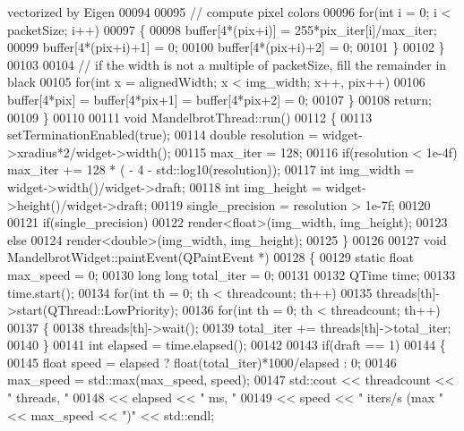 \begin{DoxyCode}
{       vectorized by Eigen}
00094 
00095       \textcolor{comment}{// compute pixel colors}
00096       \textcolor{keywordflow}{for}(\textcolor{keywordtype}{int} i = 0; i < packetSize; i++)
00097       \{
00098         buffer[4*(pix+i)] = 255*pix\_iter[i]/max\_iter;
00099         buffer[4*(pix+i)+1] = 0;
00100         buffer[4*(pix+i)+2] = 0;
00101       \}
00102     \}
00103 
00104     \textcolor{comment}{// if the width is not a multiple of packetSize, fill the remainder in black}
00105     \textcolor{keywordflow}{for}(\textcolor{keywordtype}{int} x = alignedWidth; x < img\_width; x++, pix++)
00106       buffer[4*pix] = buffer[4*pix+1] = buffer[4*pix+2] = 0;
00107   \}
00108   \textcolor{keywordflow}{return};
00109 \}
00110 
00111 \textcolor{keywordtype}{void} MandelbrotThread::run()
00112 \{
00113   setTerminationEnabled(\textcolor{keyword}{true});
00114   \textcolor{keywordtype}{double} resolution = widget->xradius*2/widget->width();
00115   max\_iter = 128;
00116   \textcolor{keywordflow}{if}(resolution < 1e-4f) max\_iter += 128 * ( - 4 - std::log10(resolution));
00117   \textcolor{keywordtype}{int} img\_width = widget->width()/widget->draft;
00118   \textcolor{keywordtype}{int} img\_height = widget->height()/widget->draft;
00119   single\_precision = resolution > 1e-7f;
00120 
00121   \textcolor{keywordflow}{if}(single\_precision)
00122     render<float>(img\_width, img\_height);
00123   \textcolor{keywordflow}{else}
00124     render<double>(img\_width, img\_height);
00125 \}
00126 
00127 \textcolor{keywordtype}{void} MandelbrotWidget::paintEvent(QPaintEvent *)
00128 \{
00129   \textcolor{keyword}{static} \textcolor{keywordtype}{float} max\_speed = 0;
00130   \textcolor{keywordtype}{long} \textcolor{keywordtype}{long} total\_iter = 0;
00131 
00132   QTime time;
00133   time.start();
00134   \textcolor{keywordflow}{for}(\textcolor{keywordtype}{int} th = 0; th < threadcount; th++)
00135     threads[th]->start(QThread::LowPriority);
00136   \textcolor{keywordflow}{for}(\textcolor{keywordtype}{int} th = 0; th < threadcount; th++)
00137   \{
00138     threads[th]->wait();
00139     total\_iter += threads[th]->total\_iter;
00140   \}
00141   \textcolor{keywordtype}{int} elapsed = time.elapsed();
00142 
00143   \textcolor{keywordflow}{if}(draft == 1)
00144   \{
00145     \textcolor{keywordtype}{float} speed = elapsed ? float(total\_iter)*1000/elapsed : 0;
00146     max\_speed = std::max(max\_speed, speed);
00147     std::cout << threadcount << \textcolor{stringliteral}{" threads, "}
00148               << elapsed << \textcolor{stringliteral}{" ms, "}
00149               << speed << \textcolor{stringliteral}{" iters/s (max "} << max\_speed << \textcolor{stringliteral}{")"} << std::endl;

\end{DoxyCode}
